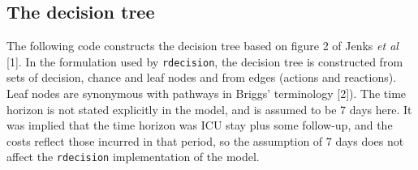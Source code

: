\documentclass[
]{article}
\newenvironment{Shaded}{\begin{snugshade}}{\end{snugshade}}
\newcommand{\DecValTok}[1]{\textcolor[rgb]{0.00,0.00,0.81}{#1}}
\newcommand{\KeywordTok}[1]{\textcolor[rgb]{0.13,0.29,0.53}{\textbf{#1}}}
\newcommand{\NormalTok}[1]{#1}
\newcommand{\OperatorTok}[1]{\textcolor[rgb]{0.81,0.36,0.00}{\textbf{#1}}}
\newcommand{\StringTok}[1]{\textcolor[rgb]{0.31,0.60,0.02}{#1}}
\begin{document}
\begin{Shaded}
\end{Shaded}

\hypertarget{the-decision-tree}{%
\subsection{The decision tree}\label{the-decision-tree}}

The following code constructs the decision tree based on figure 2 of
Jenks \emph{et al} {[}1{]}. In the formulation used by
\texttt{rdecision}, the decision tree is constructed from sets of
decision, chance and leaf nodes and from edges (actions and reactions).
Leaf nodes are synonymous with pathways in Briggs' terminology {[}2{]}).
The time horizon is not stated explicitly in the model, and is assumed
to be 7 days here. It was implied that the time horizon was ICU stay
plus some follow-up, and the costs reflect those incurred in that
period, so the assumption of 7 days does not affect the
\texttt{rdecision} implementation of the model.
\end{document}
